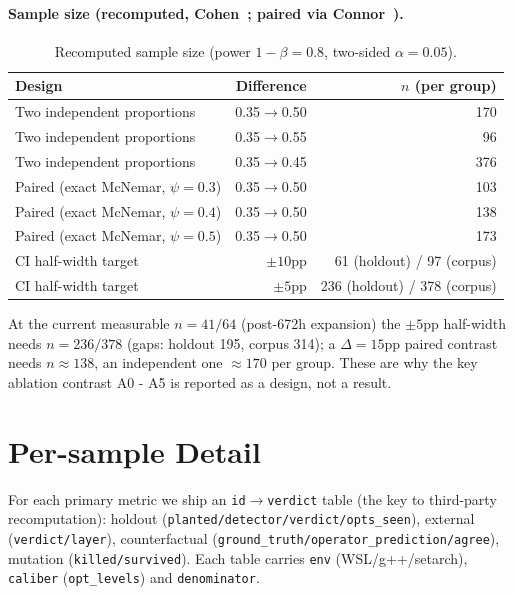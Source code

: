 \documentclass{article}
\begin{document}
\paragraph{Sample size (recomputed, Cohen~\cite{cohen1988statistical}; paired via
Connor~\cite{connor1987sample}).}
\begin{table}[h]
\caption{Recomputed sample size (power $1-\beta=0.8$, two-sided $\alpha=0.05$).}
\label{tab:samplesize}
\centering
\small
\begin{tabular}{@{}lrr@{}}
\toprule
Design & Difference & $n$ (per group) \\
\midrule
Two independent proportions & 0.35$\to$0.50 & 170 \\
Two independent proportions & 0.35$\to$0.55 & 96 \\
Two independent proportions & 0.35$\to$0.45 & 376 \\
Paired (exact McNemar, $\psi{=}0.3$) & 0.35$\to$0.50 & 103 \\
Paired (exact McNemar, $\psi{=}0.4$) & 0.35$\to$0.50 & 138 \\
Paired (exact McNemar, $\psi{=}0.5$) & 0.35$\to$0.50 & 173 \\
\midrule
CI half-width target & $\pm10$pp & 61 (holdout) / 97 (corpus) \\
CI half-width target & $\pm5$pp & 236 (holdout) / 378 (corpus) \\
\bottomrule
\end{tabular}
\end{table}
At the current measurable $n=41/64$ (post-672h expansion) the $\pm5$pp half-width needs
$n=236/378$ (gaps: holdout 195, corpus 314); a $\Delta=15$pp paired contrast needs
$n\approx138$, an independent one $\approx170$ per group. These are why the key ablation contrast
A0 - A5 is reported as a design, not a result.

\section{Per-sample Detail}
\label{app:persample}
For each primary metric we ship an \texttt{id}$\to$\texttt{verdict} table (the key to third-party
recomputation): holdout (\texttt{planted/detector/verdict/opts\_seen}), external
(\texttt{verdict/layer}), counterfactual (\texttt{ground\_truth/operator\_prediction/agree}),
mutation (\texttt{killed/survived}). Each table carries \texttt{env} (WSL/g++/setarch),
\texttt{caliber} (\texttt{opt\_levels}) and \texttt{denominator}.
\end{document}

